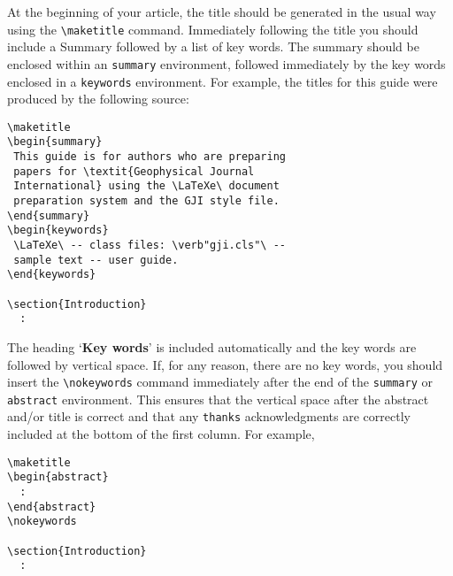 At the beginning of your article, the title should be generated in the
usual way using the \verb"\maketitle" command. Immediately following
the title you should include a Summary followed by a list of key
words. The summary should be enclosed within an \verb"summary"
environment, followed immediately by the key words enclosed in a
\verb"keywords" environment. For example, the titles for this guide
were produced by the following source:
\begin{verbatim}
\maketitle
\begin{summary}
 This guide is for authors who are preparing
 papers for \textit{Geophysical Journal
 International} using the \LaTeXe\ document
 preparation system and the GJI style file.
\end{summary}
\begin{keywords}
 \LaTeXe\ -- class files: \verb"gji.cls"\ --
 sample text -- user guide.
\end{keywords}

\section{Introduction}
  :
\end{verbatim}
The heading `\textbf{Key words}' is included automatically and the key words are
followed by vertical space. If, for any reason, there are no key words, you
should insert the \verb"\nokeywords" command immediately after the end of the
\verb"summary" or \verb"abstract" environment. This ensures that the vertical
space after the abstract and/or title is correct and that any \verb"thanks"
acknowledgments are correctly included at the bottom of the first column. For
example,
\begin{verbatim}
\maketitle
\begin{abstract}
  :
\end{abstract}
\nokeywords

\section{Introduction}
  :
\end{verbatim}

